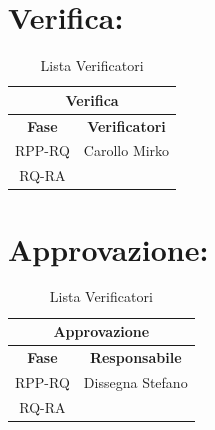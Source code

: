	
\section*{\LARGE Verifica:}
\begin{table}[!h]
	\begin{center}
		\begin{tabular}
			{|c|c|}
			\hline
			\multicolumn{2}{|c|}{ \textbf{Verifica} } \\
			\hline
			\textbf{Fase} & \textbf{Verificatori} \\
			\hline
			\multirow{1}{*}{RPP-RQ} &  Carollo Mirko \\
									
			\hline
			\multirow{1}{*}{RQ-RA} & \\
									
			\hline
		\end{tabular}
		\caption{Lista Verificatori} %
		\label{tabverifica}
	\end{center}
\end{table}

\section*{\LARGE Approvazione:}
\begin{table}[!h]
	\begin{center}
		\begin{tabular}
			{|c|c|}
			\hline
			\multicolumn{2}{|c|}{ \textbf{Approvazione} } \\
			\hline
			\textbf{Fase} & \textbf{Responsabile} \\
			\hline
			\multirow{1}{*}{RPP-RQ} &  Dissegna Stefano \\
									
			\hline
			\multirow{1}{*}{RQ-RA} & \\
									
			\hline
		\end{tabular}
		\caption{Lista Verificatori} %
		\label{tabverifica}
	\end{center}
\end{table}

